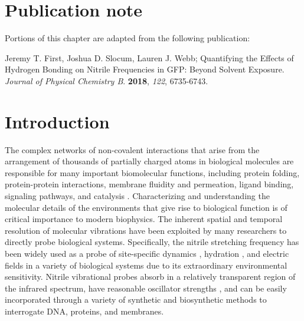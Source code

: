 \section{Publication note} \label{hbond-pub-note}

Portions of this chapter are adapted from the following publication: 

\noindent Jeremy T. First, Joshua D. Slocum, Lauren J. Webb; Quantifying the Effects of Hydrogen Bonding on Nitrile Frequencies in GFP: Beyond Solvent Exposure. \emph{Journal of Physical Chemistry B}. \textbf{2018}, \emph{122}, 6735-6743.

\section{Introduction}

The complex networks of non-covalent interactions that arise from the arrangement of thousands of partially charged atoms in biological molecules are responsible for many important biomolecular functions, including protein folding, protein-protein interactions, membrane fluidity and permeation, ligand binding, signaling pathways, and catalysis \cite{Honig1995}.
Characterizing and understanding the molecular details of the environments that give rise to biological function is of critical importance to modern biophysics.
The inherent spatial and temporal resolution of molecular vibrations have been exploited by many researchers to directly probe biological systems.
Specifically, the nitrile stretching frequency has been widely used as a probe of site-specific dynamics \cite{Fang2008, Sigala2007, Yoshikawa1985}, hydration \cite{Waegele2009, Oh2008}, and electric fields\cite{Webb2008, Slocum2016, Shrestha2015, Shrestha2017, Andrews2000, Andrews2002} in a variety of biological systems due to its extraordinary environmental sensitivity.
Nitrile vibrational probes absorb in a relatively transparent region of the infrared spectrum, have reasonable oscillator strengths \cite{Webb2008}, and can be easily incorporated through a variety of synthetic and biosynthetic methods\cite{Fafarman2006, Getahun2003, Kirshenbaum2002} to interrogate DNA, proteins, and membranes. 

